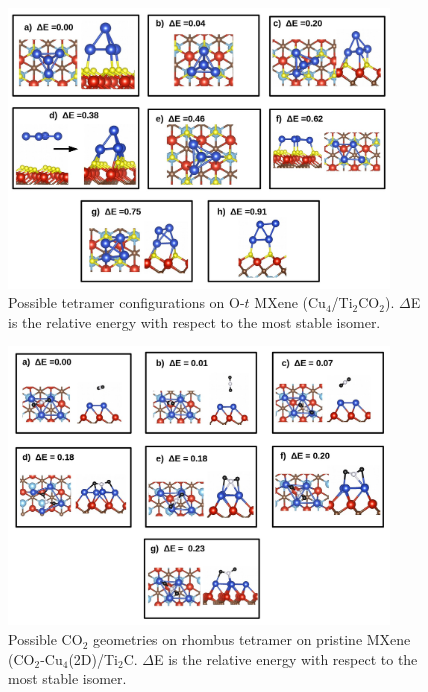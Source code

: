 \begin{figure}[htb]
  \begin{center}
    \includegraphics[width=0.9\textwidth]{./Appendix2/Appendix2_figures/photo12.jpg}
  \end{center}
    \caption{Possible tetramer configurations on O-$t$ MXene (Cu$_4$/Ti$_2$CO$_2$). $\Delta$E is the relative energy with respect to the most stable isomer.}
  \label{fig-012}
\end{figure}

\begin{figure}[htb]
  \begin{center}
    \includegraphics[width=0.9\textwidth]{./Appendix2/Appendix2_figures/photo13.jpg}
  \end{center}
    \caption{Possible CO$_2$ geometries on rhombus tetramer on pristine MXene (CO$_2$-Cu$_4$(2D)/Ti$_2$C. $\Delta$E is the relative energy with respect to the most stable isomer.}
  \label{fig-013}
\end{figure}



